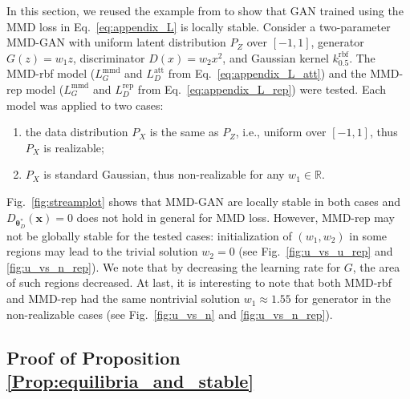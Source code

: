\documentclass{article} %
\theoremstyle{plain}
\newtheorem*{proposition 1*}{Proposition 1}
\newcommand{\set}[1]{\mathbb{#1}}  %
\begin{document}
\begin{appendices}
In this section, we reused the example from \cite{gan_stable} to show that GAN trained using the MMD loss in Eq.~\ref{eq:appendix_L} is locally stable. Consider a two-parameter MMD-GAN with uniform latent distribution \(P_Z\) over \([-1,1]\), generator \(G(z)=w_1z\), discriminator \(D(x)=w_2x^2\), and Gaussian kernel \(k_{0.5}^{\text{rbf}}\). The MMD-rbf model (\(L_G^{\text{mmd}}\) and \(L_D^{\text{att}}\) from Eq.~\ref{eq:appendix_L_att}) and the MMD-rep model (\(L_G^{\text{mmd}}\) and \(L_{D}^{\text{rep}}\) from Eq.~\ref{eq:appendix_L_rep}) were tested. Each model was applied to two cases:
\begin{enumerate}[label=(\alph*),leftmargin=*]
	\item the data distribution \(P_X\) is the same as \(P_Z\), i.e., uniform over \([-1,1]\), thus \(P_X\) is realizable;
	\item \(P_X\) is standard Gaussian, thus non-realizable for any \(w_1\in\set{R}\). 
\end{enumerate}
Fig.~\ref{fig:streamplot} shows that MMD-GAN are locally stable in both cases and \(D_{\bm{\theta}_D^*}(\bm{x})=0\) does not hold in general for MMD loss. However, MMD-rep may not be globally stable for the tested cases: initialization of \((w_1,w_2)\) in some regions may lead to the trivial solution \(w_2=0\) (see Fig.~\ref{fig:u_vs_u_rep} and \ref{fig:u_vs_n_rep}). We note that by decreasing the learning rate for \(G\), the area of such regions decreased. At last, it is interesting to note that both MMD-rbf and MMD-rep had the same nontrivial solution \(w_1\approx1.55\) for generator in the non-realizable cases (see Fig.~\ref{fig:u_vs_n} and \ref{fig:u_vs_n_rep}). 

\subsection{Proof of Proposition \ref{Prop:equilibria_and_stable}}
\label{sec:proof_prop1}


\end{appendices}
\end{document}
